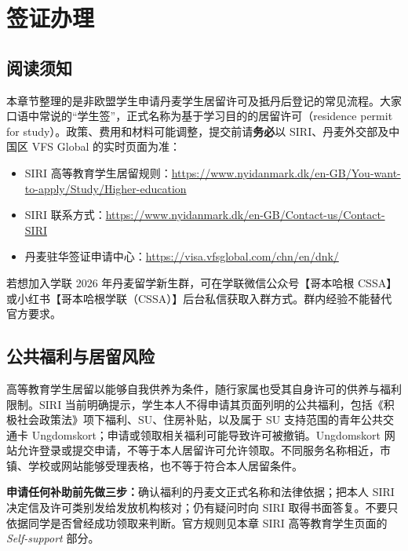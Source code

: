 


\section{签证办理}

\subsection{阅读须知}

本章节整理的是非欧盟学生申请丹麦学生居留许可及抵丹后登记的常见流程。大家口语中常说的“学生签”，正式名称为基于学习目的的居留许可（residence permit for study）。政策、费用和材料可能调整，提交前请\textbf{务必}以 SIRI、丹麦外交部及中国区 VFS Global 的实时页面为准：

\begin{itemize}[label=•,leftmargin=2em,itemsep=2pt]
  \item SIRI 高等教育学生居留规则：\url{https://www.nyidanmark.dk/en-GB/You-want-to-apply/Study/Higher-education}
  \item SIRI 联系方式：\url{https://www.nyidanmark.dk/en-GB/Contact-us/Contact-SIRI}
  \item 丹麦驻华签证申请中心：\url{https://visa.vfsglobal.com/chn/en/dnk/}


\end{itemize}


若想加入学联 2026 年丹麦留学新生群，可在学联微信公众号【哥本哈根 CSSA】或小红书【哥本哈根学联（CSSA）】后台私信获取入群方式。群内经验不能替代官方要求。

\subsection{公共福利与居留风险}\label{sec:benefit-risk}

高等教育学生居留以能够自我供养为条件，随行家属也受其自身许可的供养与福利限制。SIRI 当前明确提示，学生本人不得申请其页面列明的公共福利，包括《积极社会政策法》项下福利、SU、住房补贴，以及属于 SU 支持范围的青年公共交通卡 Ungdomskort；申请或领取相关福利可能导致许可被撤销。Ungdomskort 网站允许登录或提交申请，不等于本人居留许可允许领取。不同服务名称相近，市镇、学校或网站能够受理表格，也不等于符合本人居留条件。

\begin{grayleftbox}
\textbf{申请任何补助前先做三步：}确认福利的丹麦文正式名称和法律依据；把本人 SIRI 决定信及许可类别发给发放机构核对；仍有疑问时向 SIRI 取得书面答复。不要只依据同学是否曾经成功领取来判断。官方规则见本章 SIRI 高等教育学生页面的 \emph{Self-support} 部分。
\end{grayleftbox}


